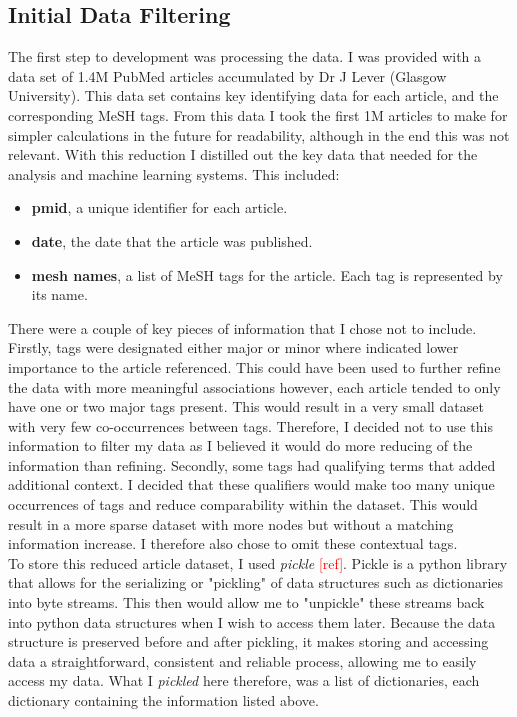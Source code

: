 \documentclass{l4proj}
\begin{document}
\subsection{Initial Data Filtering}

The first step to development was processing the data. I was provided with a data set of 1.4M PubMed articles accumulated by Dr J Lever (Glasgow University). This data set contains key identifying data for each article, and the corresponding MeSH tags. From this data I took the first 1M articles to make for simpler calculations in the future for readability, although in the end this was not relevant. With this reduction I distilled out the key data that needed for the analysis and machine learning systems. This included:
\\
\begin{itemize}
    \item \textbf{pmid}, a unique identifier for each article.
    \item \textbf{date}, the date that the article was published.
    \item \textbf{mesh names}, a list of MeSH tags for the article. Each tag is represented by its name. \\
\end{itemize}

There were a couple of key pieces of information that I chose not to include. Firstly, tags were designated either major or minor where  indicated lower importance to the article referenced. This could have been used to further refine the data with more meaningful associations however, each article tended to only have one or two major tags present. This would result in a very small dataset with very few co-occurrences between tags. Therefore, I decided not to use this information to filter my data as I believed it would do more reducing of the information than refining. Secondly, some tags had qualifying terms that added additional context. I decided that these qualifiers would make too many unique occurrences of tags and reduce comparability within the dataset. This would result in a more sparse dataset with  more nodes but without a matching information increase. I therefore also chose to omit these contextual tags.\\

To store this reduced article dataset, I used \textit{pickle} \textcolor{red}{[ref]}. Pickle is a python library that allows for the serializing or "pickling" of data structures such as dictionaries into byte streams. This then would allow me to "unpickle" these streams back into python data structures when I wish to access them later. Because the data structure is preserved before and after pickling, it makes storing and accessing data a straightforward, consistent and reliable process, allowing me to easily access my data. What I \textit{pickled} here therefore, was a list of dictionaries, each dictionary containing the information listed above.\\
\end{document}
